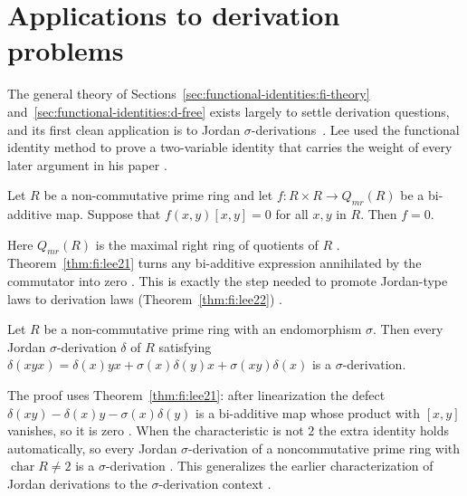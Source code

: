 \section{Applications to derivation problems}\label{sec:functional-identities:applications-to-derivations}

The general theory of
Sections~\ref{sec:functional-identities:fi-theory}
and~\ref{sec:functional-identities:d-free} exists largely to settle
derivation questions, and its first clean application is to Jordan
$\sigma$-derivations~\cite[Section~2, p.~221]{LeeTK2015JordanFI}. Lee used the functional identity method to prove
a two-variable identity that carries the weight of every later argument in
his paper \cite[Section~2, p.~221]{LeeTK2015JordanFI}.

\begin{theorem}\label{thm:fi:lee21}
Let $R$ be a non-commutative prime ring and let $f\colon R\times R\to
Q_{mr}(R)$ be a bi-additive map. Suppose that $f(x,y)[x,y]=0$ for all
$x,y$ in $R$. Then $f=0$.
\end{theorem}

Here $Q_{mr}(R)$ is the maximal right ring of quotients of $R$
\cite[p.~221]{LeeTK2015JordanFI}. Theorem~\ref{thm:fi:lee21} turns any
bi-additive expression annihilated by the commutator into zero
\cite[p.~221]{LeeTK2015JordanFI}. This is exactly the step needed to
promote Jordan-type laws to derivation laws (Theorem~\ref{thm:fi:lee22})
\cite[p.~221]{LeeTK2015JordanFI}.\begin{theorem}\label{thm:fi:lee22}
Let $R$ be a non-commutative prime ring with an endomorphism $\sigma$.
Then every Jordan $\sigma$-derivation $\delta$ of $R$ satisfying
$\delta(xyx)=\delta(x)yx+\sigma(x)\delta(y)x+\sigma(xy)\delta(x)$ is a
$\sigma$-derivation.
\end{theorem}

The proof uses Theorem~\ref{thm:fi:lee21}: after linearization the defect
$\delta(xy)-\delta(x)y-\sigma(x)\delta(y)$ is a bi-additive map whose
product with $[x,y]$ vanishes, so it is zero
\cite[p.~221]{LeeTK2015JordanFI}. When the characteristic is not $2$ the
extra identity holds automatically, so every Jordan $\sigma$-derivation of
a noncommutative prime ring with $\operatorname{char}R\ne 2$ is a
$\sigma$-derivation \cite[Corollary~2.3, p.~3]{LeeTK2015JordanFI}. This
generalizes the earlier characterization of Jordan derivations to the
$\sigma$-derivation context \cite[p.~221]{LeeTK2015JordanFI}.

